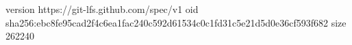 version https://git-lfs.github.com/spec/v1
oid sha256:ebc8fe95cad2f4c6ea1fac240c592d61534c0c1fd31c5e21d5d0e36cf593f682
size 262240
